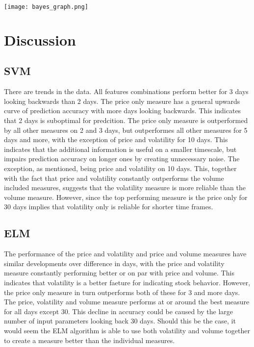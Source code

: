 \documentclass{article}
\begin{document}
\texttt{[image: bayes\_graph.png]}

\newpage

\section{Discussion}
\subsection{SVM}
There are trends in the data. All features combinations perform better for 3 days looking backwards than 2 days. The price only measure has a general upwards curve of prediction accuracy with more days looking backwards. This indicates that 2 days is suboptimal for predcition. The price only measure is outperformed by all other measures on 2 and 3 days, but outperformes all other measures for 5 days and more, with the exception of price and volatility for 10 days. This indicates that the additional information is useful on a smaller timescale, but impairs prediction accuracy on longer ones by creating unnecessary noise. The exception, as mentioned, being price and volatility on 10 days. This, together with the fact that price and volatility constantly outperforms the volume included measures, suggests that the volatility measure is more reliable than the volume measure. However, since the top performing measure is the price only for 30 days implies that volatility only is reliable for shorter time frames.

\subsection{ELM}
The performance of the price and volatility and price and volume measures have similar developments over difference in days, with the price and volatility measure constantly performing better or on par with price and volume. This indicates that volatility is a better faeture for indicating stock behavior. However, the price only measure in turn outperforms both of these for 3 and more days. The price, volatility and volume measure performs at or around the best measure for all days except 30. This decline in accuracy could be caused by the large number of input parameters looking back 30 days. Should this be the case, it would seem the ELM algorithm is able to use both volatility and volume together to create a measure better than the individual measures. 
\end{document}

